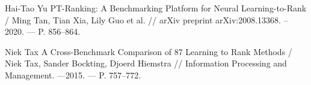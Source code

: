 \begin{thebibliography}{}
 Hai-Tao Yu PT-Ranking: A Benchmarking Platform for Neural Learning-to-Rank / Ming Tan, Tian Xia, Lily Guo et al. // arXiv preprint arXiv:2008.13368. – 2020. --- P. 856--864.

 Niek Tax A Cross-Benchmark Comparison of 87 Learning to Rank Methods / Niek Tax, Sander Bockting, Djoerd Hiemstra // Information Processing and Management. ---2015. --- P. 757--772.

\end{thebibliography}


